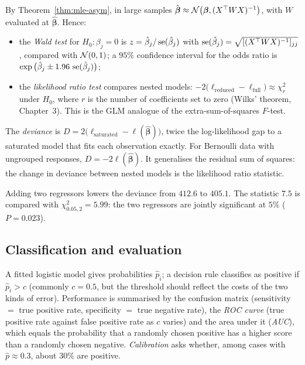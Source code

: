 By Theorem~\ref{thm:mle-asym}, in large samples $\hat{\boldsymbol\beta}\approx\mathcal{N}\big(\boldsymbol\beta,(X^{\top} WX)^{-1}\big)$, with $W$ evaluated at $\hat{\boldsymbol\beta}$. Hence:
\begin{itemize}
  \item the \emph{Wald test} for $H_0:\beta_j=0$ is $z=\hat\beta_j/\operatorname{se}(\hat\beta_j)$ with $\operatorname{se}(\hat\beta_j)=\sqrt{[(X^{\top} WX)^{-1}]_{jj}}$, compared with $\mathcal{N}(0,1)$; a $95\%$ confidence interval for the odds ratio is $\exp\big(\hat\beta_j\pm1.96\,\operatorname{se}(\hat\beta_j)\big)$;
  \item the \emph{likelihood ratio test} compares nested models: $-2\big(\ell_{\mathrm{reduced}}-\ell_{\mathrm{full}}\big)\approx\chi^2_r$ under $H_0$, where $r$ is the number of coefficients set to zero (Wilks' theorem, Chapter~3). This is the GLM analogue of the extra-sum-of-squares $F$-test.
\end{itemize}

\begin{definition}[Deviance]
The \emph{deviance} is $D=2\big(\ell_{\mathrm{saturated}}-\ell(\hat{\boldsymbol\beta})\big)$, twice the log-likelihood gap to a saturated model that fits each observation exactly. For Bernoulli data with ungrouped responses, $D=-2\ell(\hat{\boldsymbol\beta})$. It generalises the residual sum of squares: the change in deviance between nested models is the likelihood ratio statistic.
\end{definition}

\begin{example}
Adding two regressors lowers the deviance from $412.6$ to $405.1$. The statistic $7.5$ is compared with $\chi^2_{0.05,2}=5.99$: the two regressors are jointly significant at $5\%$ ($P=0.023$).
\end{example}

\subsection{Classification and evaluation}

A fitted logistic model gives probabilities $\hat{p}_i$; a decision rule classifies as positive if $\hat{p}_i>c$ (commonly $c=0.5$, but the threshold should reflect the costs of the two kinds of error). Performance is summarised by the confusion matrix (sensitivity $=$ true positive rate, specificity $=$ true negative rate), the \emph{ROC curve} (true positive rate against false positive rate as $c$ varies) and the area under it (\emph{AUC}), which equals the probability that a randomly chosen positive has a higher score than a randomly chosen negative. \emph{Calibration} asks whether, among cases with $\hat{p}\approx0.3$, about $30\%$ are positive.

